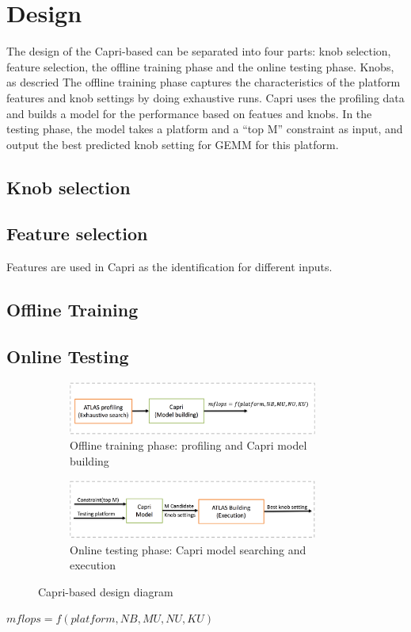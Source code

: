 \section{Design}
\label{sec:design}

The design of the Capri-based \atl can be separated into four parts: knob
selection, feature selection, the offline training phase and the online testing
phase. Knobs, as descried
The offline training phase captures
the characteristics of the platform features and knob settings by doing
exhaustive runs. Capri uses the profiling data and builds a model for the \gem
performance based on featues and knobs. In the testing phase, the model takes
a platform and a ``top M'' constraint as input, and output the best predicted
knob setting for GEMM for this platform.

  \subsection{Knob selection}
  \label{sec:knobs}

  \subsection{Feature selection}
  \label{sec:features}
  Features are used in Capri as the identification for different inputs.

  \subsection{Offline Training}
  \label{sec:offline_training}

  \subsection{Online Testing}
  \label{sec:online_training}

\begin{figure}[tbhp]
  \centering
  \begin{subfigure}[b]{1.0\linewidth}
    \centering
    \includegraphics[width=0.9\textwidth]{images/offline_training.png}
    \caption{Offline training phase: \atl profiling and Capri model building}
  \end{subfigure}
  \begin{subfigure}[b]{1.0\linewidth}
    \centering
    \includegraphics[width=0.9\textwidth]{images/testing.png}
    \caption{Online testing phase: Capri model searching and \atl execution}
  \end{subfigure}
  \caption{Capri-based \atl design diagram}
  \label{fig:design}
\end{figure}

$mflops = f(platform, NB, MU, NU, KU)$
